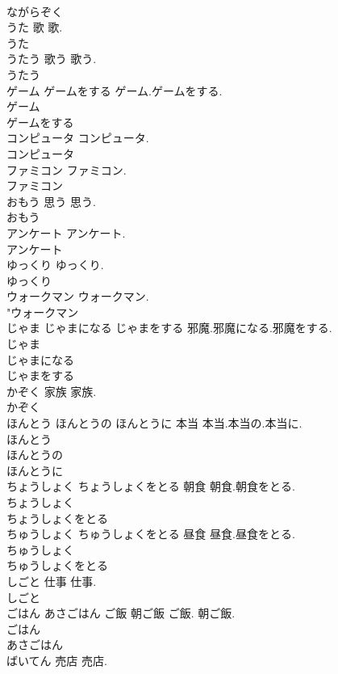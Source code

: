 \documentclass[8pt]{extreport}
\begin{document}
\begin{CJK}{UTF8}{min}
\\	ながらぞく
\\	うた	歌	歌.	
\\	うた
\\	うたう	歌う	歌う.	
\\	うたう
\\	ゲーム ゲームをする		ゲーム.ゲームをする.	
\\	ゲーム
\\	ゲームをする
\\	コンピュータ		コンピュータ.	
\\	コンピュータ
\\	ファミコン		ファミコン.	
\\	ファミコン
\\	おもう	思う	思う.	
\\	おもう
\\	アンケート		アンケート.	
\\	アンケート
\\	ゆっくり		ゆっくり.	
\\	ゆっくり
\\	ウォークマン		ウォークマン.	
\\	"ウォークマン
\\	じゃま じゃまになる じゃまをする		邪魔.邪魔になる.邪魔をする.	
\\	じゃま
\\	じゃまになる
\\	じゃまをする
\\	かぞく	家族	家族.	
\\	かぞく
\\	ほんとう ほんとうの ほんとうに	本当	本当.本当の.本当に.	
\\	ほんとう
\\	ほんとうの
\\	ほんとうに
\\	ちょうしょく ちょうしょくをとる	朝食	朝食.朝食をとる.	
\\	ちょうしょく
\\	ちょうしょくをとる
\\	ちゅうしょく ちゅうしょくをとる	昼食	昼食.昼食をとる.	
\\	ちゅうしょく
\\	ちゅうしょくをとる
\\	しごと	仕事	仕事.	
\\	しごと
\\	ごはん あさごはん	ご飯 朝ご飯	ご飯. 朝ご飯.	
\\	ごはん
\\	あさごはん
\\	ばいてん	売店	売店.	

\end{CJK}
\end{document}

